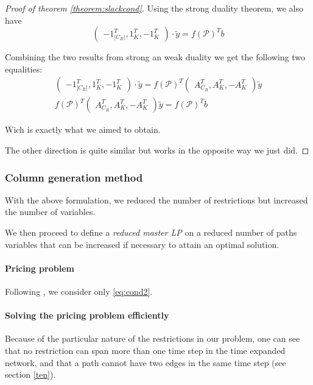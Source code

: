 \documentclass[14pt,a4paper]{article}
\theoremstyle{definition}
\numberwithin{equation}{subsection}
\begin{document}
\begin{proof}[Proof of theorem \ref{theorem:slackcond}]
 Using the strong duality theorem, we also have 
 $$\left( \begin{matrix} -1_{|C_R|}^T, 1_K^T, -1_K^T  \end{matrix} \right)\cdot \tilde{y} =  f(\mathcal{P})^Tb  $$

Combining the two results from strong an weak duality we get the following two equalities:
\begin{align*}
\left( \begin{matrix} -1_{|C_R|}^T, 1_K^T, -1_K^T  \end{matrix} \right)\cdot \tilde{y} = 
f(\mathcal{P})^T \left( \begin{matrix} A_{C_R}^T, A_K^T, -A_K^T \end{matrix} \right)\tilde{y} \\
f(\mathcal{P})^T \left( \begin{matrix} A_{C_R}^T, A_K^T, -A_K^T \end{matrix} \right)\tilde{y} =  f(\mathcal{P})^Tb 
\end{align*}

Wich is exactly what we aimed to obtain.

The other direction is quite similar but works in the opposite way we just did.

	 
	 
\end{proof}
\subsubsection{Column generation method}

With the above formulation,  we reduced the number of restrictions but increased the number of variables. 

We then proceed to define a \emph{reduced master LP} on a reduced number of paths variables that can be increased if necessary to attain an optimal solution.



\paragraph{Pricing problem}
Following \cite[p.~669]{networkflows}, we consider only \eqref{eq:cond2}. 
\paragraph{Solving the pricing problem efficiently}
Because of the particular nature of the restrictions in our problem, one can see that no restriction can span more than one time step in the time expanded network, and that a path cannot have two edges in the same time step (see section \ref*{ten}). 
\end{document}
